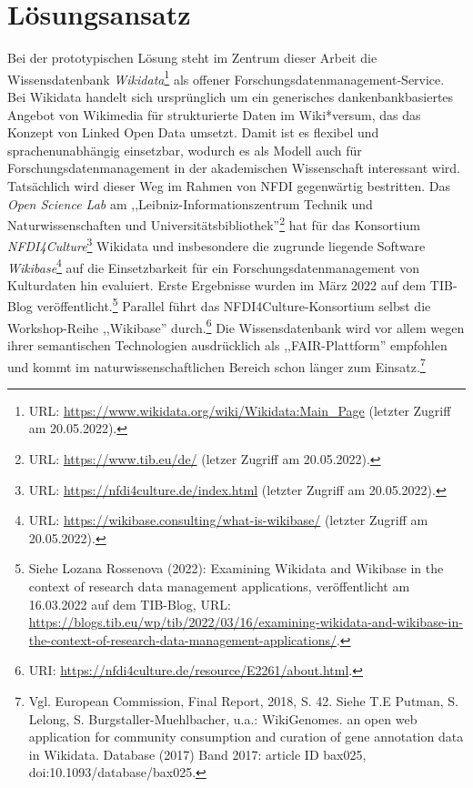 \onehalfspacing

\section{Lösungsansatz}

Bei der prototypischen Lösung steht im Zentrum dieser Arbeit die Wissensdatenbank \textit{Wikidata}\footnote{URL: \url{https://www.wikidata.org/wiki/Wikidata:Main_Page} (letzter Zugriff am 20.05.2022).} als offener Forschungsdatenmanagement-Service. Bei Wikidata handelt sich ursprünglich um ein generisches dankenbankbasiertes Angebot von Wikimedia für strukturierte Daten im Wiki*versum, das das Konzept von Linked Open Data umsetzt. Damit ist es flexibel und sprachenunabhängig einsetzbar, wodurch es als Modell auch für Forschungsdatenmanagement in der akademischen Wissenschaft interessant wird. Tatsächlich wird dieser Weg im Rahmen von NFDI gegenwärtig bestritten. Das \textit{Open Science Lab} am ,,Leibniz-Informationszentrum Technik und Naturwissenschaften und Universitätsbibliothek''\footnote{URL: \url{https://www.tib.eu/de/} (letzer Zugriff am 20.05.2022).} hat für das Konsortium \textit{NFDI4Culture}\footnote{URL: \url{https://nfdi4culture.de/index.html} (letzter Zugriff am 20.05.2022).} Wikidata und insbesondere die zugrunde liegende Software \textit{Wikibase}\footnote{URL: \url{https://wikibase.consulting/what-is-wikibase/} (letzter Zugriff am 20.05.2022).} auf die Einsetzbarkeit für ein Forschungsdatenmanagement von Kulturdaten hin evaluiert. Erste Ergebnisse wurden im März 2022 auf dem TIB-Blog veröffentlicht.\footnote{Siehe Lozana Rossenova (2022): Examining Wikidata and Wikibase in the context of research data management applications, veröffentlicht am 16.03.2022 auf dem TIB-Blog, URL: \url{https://blogs.tib.eu/wp/tib/2022/03/16/examining-wikidata-and-wikibase-in-the-context-of-research-data-management-applications/}.} Parallel führt das NFDI4Culture-Konsortium selbst die Workshop-Reihe ,,Wikibase'' durch.\footnote{URI: \url{https://nfdi4culture.de/resource/E2261/about.html}.} Die Wissensdatenbank wird vor allem wegen ihrer semantischen Technologien ausdrücklich als ,,FAIR-Plattform'' empfohlen und kommt im naturwissenschaftlichen Bereich schon länger zum Einsatz.\footnote{Vgl. European Commission, Final Report, 2018, S. 42. Siehe T.E Putman, S. Lelong, S. Burgstaller-Muehlbacher, u.a.: WikiGenomes. an open web application for community consumption and curation of gene annotation data in Wikidata. Database (2017) Band 2017: article ID bax025, doi:10.1093/database/bax025.} 


